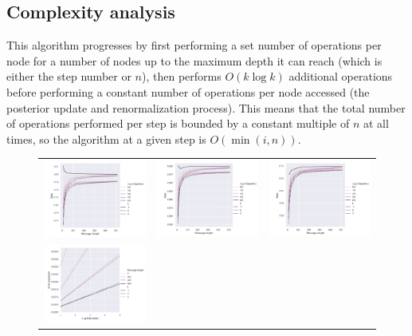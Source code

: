\documentclass{IEEEtran}
\begin{document}
\subsection{Complexity analysis}
This algorithm progresses by first performing
a set number of operations per node for a number of nodes
up to the maximum depth
it can reach (which is either the step number or $n$), then
performs $O(k\log k)$ additional operations
before performing a constant number of operations per node accessed
(the posterior update and renormalization process). This means that
the total number of operations performed per step is bounded by a constant
multiple of $n$ at all times, so the algorithm at a given step is
$O(\min(i,n))$. 
\begin{figure}
	\centering
	\begin{tabular}{ccc}
	\includegraphics[width=0.35\linewidth]{img/ratep0757q05} &
	\includegraphics[width=0.35\linewidth]{img/ratep089q09} &
	\includegraphics[width=0.35\linewidth]{img/ratep0947q095} \\
	\includegraphics[width=0.35\linewidth]{img/errexp0757q05} &

\end{tabular}
\end{figure}
\end{document}
